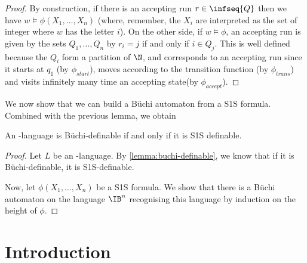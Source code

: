 \begin{proof}
    By construction, if there is an accepting run $r \in \infseq{Q}$
    then we have $w \models \phi(X_1, \dots, X_n)$ (where, remember, the $X_i$
    are interpreted as the set of integer where $w$ has the letter $i$).
    On the other side, if $w \models \phi$, an accepting run
    is given by the sets $Q_1, \dots, Q_{n}$ by $r_i = j$
    if and only if $i \in Q_j$. This is well defined because the $Q_i$
    form a partition of $\N$, and corresponds to an accepting run
    since it starts at $q_1$ (by $\phi_{start}$),
    moves according to the transition function (by $\phi_{trans}$)
    and visits infinitely many time an accepting state(by $\phi_{accept}$).
\end{proof}


We now show that we can build a Büchi automaton from
a S1S formula. Combined with the previous lemma, we obtain

\begin{theorem}
    An \w-language is Büchi-definable if and only if
    it is S1S definable.
\end{theorem}

\begin{proof}
    Let $L$ be an \w-language. By \autoref{lemma:buchi-definable},
    we know that if it is Büchi-definable, it is S1S-definable.

    Now, let $\phi(X_1, \dots, X_n)$ be a S1S formula.
    We show that there is a Büchi automaton on the language $\IB^n$
    recognising this language by induction on the height of $\phi$.

\end{proof}




























\iffalse
\section{Introduction}

